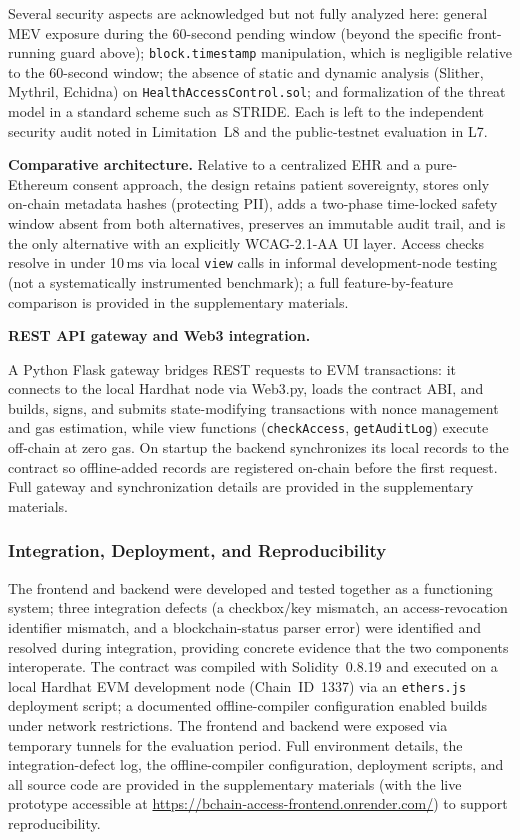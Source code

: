 \documentclass[journal,onecolumn]{IEEEtran}
\begin{document}
Several security aspects are acknowledged but not fully analyzed here: general MEV exposure during the 60-second pending window (beyond the specific front-running guard above); \texttt{block.timestamp} manipulation, which is negligible relative to the 60-second window; the absence of static and dynamic analysis (Slither, Mythril, Echidna) on \texttt{HealthAccessControl.sol}; and formalization of the threat model in a standard scheme such as STRIDE. Each is left to the independent security audit noted in Limitation~L8 and the public-testnet evaluation in L7.

\noindent\textbf{Comparative architecture.} Relative to a centralized EHR and a pure-Ethereum consent approach, the design retains patient sovereignty, stores only on-chain metadata hashes (protecting PII), adds a two-phase time-locked safety window absent from both alternatives, preserves an immutable audit trail, and is the only alternative with an explicitly WCAG-2.1-AA UI layer. Access checks resolve in under 10\,ms via local \texttt{view} calls in informal development-node testing (not a systematically instrumented benchmark); a full feature-by-feature comparison is provided in the supplementary materials.

\noindent\textbf{REST API gateway and Web3 integration.}

A Python Flask gateway bridges REST requests to EVM transactions: it connects to the local Hardhat node via Web3.py, loads the contract ABI, and builds, signs, and submits state-modifying transactions with nonce management and gas estimation, while view functions (\texttt{checkAccess}, \texttt{getAuditLog}) execute off-chain at zero gas. On startup the backend synchronizes its local records to the contract so offline-added records are registered on-chain before the first request. Full gateway and synchronization details are provided in the supplementary materials.

\subsubsection{Integration, Deployment, and Reproducibility}
\label{subsubsec:bugs}

The frontend and backend were developed and tested together as a functioning system; three integration defects (a checkbox/key mismatch, an access-revocation identifier mismatch, and a blockchain-status parser error) were identified and resolved during integration, providing concrete evidence that the two components interoperate. The contract was compiled with Solidity~0.8.19 and executed on a local Hardhat EVM development node (Chain~ID~1337) via an \texttt{ethers.js} deployment script; a documented offline-compiler configuration enabled builds under network restrictions. The frontend and backend were exposed via temporary tunnels for the evaluation period. Full environment details, the integration-defect log, the offline-compiler configuration, deployment scripts, and all source code are provided in the supplementary materials (with the live prototype accessible at \url{https://bchain-access-frontend.onrender.com/}) to support reproducibility.
\end{document}
